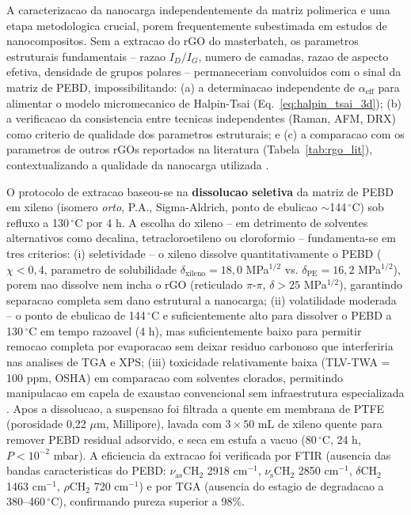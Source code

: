 \documentclass[11pt,a4paper,oneside]{article}
\begin{document}
A caracterizacao da nanocarga independentemente da matriz polimerica e uma etapa
metodologica crucial, porem frequentemente subestimada em estudos de nanocompositos. Sem a
extracao do rGO do masterbatch, os parametros estruturais fundamentais -- razao $I_D/I_G$,
numero de camadas, razao de aspecto efetiva, densidade de grupos polares -- permaneceriam
convoluidos com o sinal da matriz de PEBD, impossibilitando: (a) a determinacao independente
de $\alpha_{\text{eff}}$ para alimentar o modelo micromecanico de Halpin-Tsai (Eq.~\ref{eq:halpin_tsai_3d});
(b) a verificacao da consistencia entre tecnicas independentes (Raman, AFM, DRX) como criterio
de qualidade dos parametros estruturais; e (c) a comparacao com os parametros de outros rGOs
reportados na literatura (Tabela~\ref{tab:rgo_lit}), contextualizando a qualidade da nanocarga
utilizada \cite{Ferrari2000, Faria2017}.

O protocolo de extracao baseou-se na {\bfseries dissolucao seletiva} da matriz de PEBD em
xileno (isomero \textit{orto}, P.A., Sigma-Aldrich, ponto de ebulicao ${\sim}$144$\,^{\circ}$C)
sob refluxo a 130$\,^{\circ}$C por 4 h. A escolha do xileno -- em detrimento de solventes
alternativos como decalina, tetracloroetileno ou cloroformio -- fundamenta-se em tres criterios:
(i) seletividade -- o xileno dissolve quantitativamente o PEBD ($\chi{<}0{,}4$, parametro de
solubilidade $\delta_{\text{xileno}}{=}18{,}0$ MPa$^{1/2}$ vs. $\delta_{\text{PE}}{=}16{,}2$
MPa$^{1/2}$), porem nao dissolve nem incha o rGO (reticulado $\pi$-$\pi$, $\delta{>}25$
MPa$^{1/2}$), garantindo separacao completa sem dano estrutural a nanocarga; (ii) volatilidade
moderada -- o ponto de ebulicao de 144$\,^{\circ}$C e suficientemente alto para dissolver o
PEBD a 130$\,^{\circ}$C em tempo razoavel (4 h), mas suficientemente baixo para permitir
remocao completa por evaporacao sem deixar residuo carbonoso que interferiria nas analises de
TGA e XPS; (iii) toxicidade relativamente baixa (TLV-TWA = 100 ppm, OSHA) em comparacao com
solventes clorados, permitindo manipulacao em capela de exaustao convencional sem
infraestrutura especializada \cite{Faria2017}. Apos a dissolucao, a suspensao foi filtrada a
quente em membrana de PTFE (porosidade 0,22 $\mu$m, Millipore), lavada com $3{\times}50$ mL de
xileno quente para remover PEBD residual adsorvido, e seca em estufa a vacuo (80$\,^{\circ}$C,
24 h, $P{<}10^{-2}$ mbar). A eficiencia da extracao foi verificada por FTIR (ausencia das
bandas caracteristicas do PEBD: $\nu_{\text{as}}$CH$_2$ 2918 cm$^{-1}$, $\nu_{\text{s}}$CH$_2$
2850 cm$^{-1}$, $\delta$CH$_2$ 1463 cm$^{-1}$, $\rho$CH$_2$ 720 cm$^{-1}$) e por TGA (ausencia
do estagio de degradacao a 380--460$\,^{\circ}$C), confirmando pureza superior a 98\%.
\end{document}
